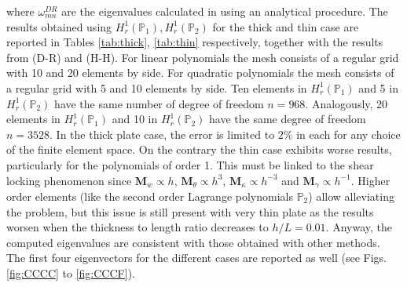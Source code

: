 \documentclass[11t]{article}
\begin{document}
{		where $\omega_{mn}^{DR}$ are the eigenvalues calculated in \cite{dawe1980rayleigh} using an analytical procedure. The results obtained using $H_r^1(\mathbb{P}_1), H_r^1(\mathbb{P}_2)$ for the thick and thin case are reported in Tables \ref{tab:thick}, \ref{tab:thin} respectively, together with the results from \cite{dawe1980rayleigh} (D-R) and \cite{huang1984nine} (H-H). For linear polynomials the mesh consists of a regular grid with 10 and 20 elements by side. For quadratic polynomials the mesh consists of a regular grid with 5 and 10 elements by side. Ten elements in $H_r^1(\mathbb{P}_1)$ and 5 in $H_r^1(\mathbb{P}_2)$ have the same number of degree of freedom $n=968$. Analogously, 20 elements in $H_r^1(\mathbb{P}_1)$ and 10 in $H_r^1(\mathbb{P}_2)$ have the same degree of freedom $n=3528$.  In the thick plate case,  the error is limited to $2\%$ in each for any choice of the finite element space.  On the contrary the thin case exhibits worse results, particularly for the polynomials of order 1. This must be linked to the shear locking phenomenon since $\bm{M}_{w} \propto h$, $\bm{M}_{\theta} \propto h^3$, $\bm{M}_{\kappa} \propto h^{-3}$ and $\bm{M}_{\gamma} \propto h^{-1}$. Higher order elements (like the second order Lagrange polynomials $\mathbb{P}_2$) allow alleviating the problem, but this issue is still present with very thin plate as the results worsen when the thickness to length ratio decreases to $h/L = 0.01$. Anyway, the computed eigenvalues are consistent with those obtained with other methods. The first four eigenvectors for the different cases are reported as well (see Figs. \ref{fig:CCCC} to \ref{fig:CCCF}).
	}
	
\end{document}
